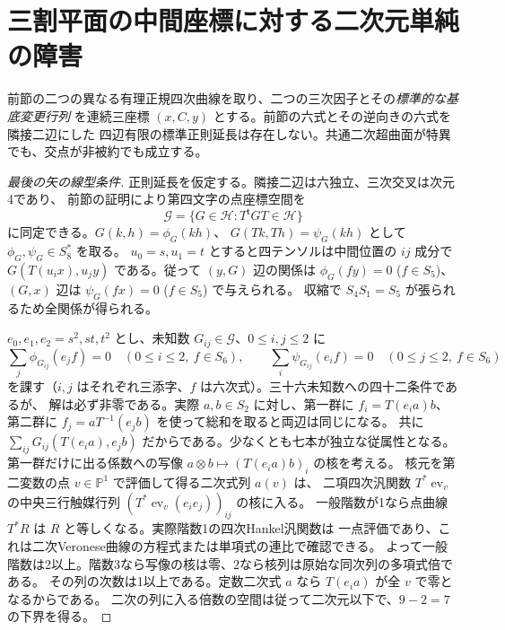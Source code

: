 \section{三割平面の中間座標に対する二次元単純の障害}
\label{sec:trisecant-middle-simple-obstruction}
\begin{theorem}\label{thm:trisecant-middle-simple-obstruction}
前節の二つの異なる有理正規四次曲線を取り、二つの三次因子とその\emph{標準的な基底変更行列}
を連続三座標 $(x,C,y)$ とする。前節の六式とその逆向きの六式を隣接二辺にした
四辺有限の標準正則延長は存在しない。共通二次超曲面が特異でも、交点が非被約でも成立する。
\end{theorem}
\begin{proof}[最後の矢の線型条件]
正則延長を仮定する。隣接二辺は六独立、三次交叉は次元4であり、
前節の証明により第四文字の点座標空間を
\[
 \mathcal G=\{G\in\mathcal H:T^{\mathsf t}GT\in\mathcal H\}
\]
に同定できる。$G(k,h)=\phi_G(kh)$、
$G(Tk,Th)=\psi_G(kh)$ として $\phi_G,\psi_G\in S_8^*$ を取る。
$u_0=s,u_1=t$ とすると四テンソルは中間位置の $ij$ 成分で
$G(T(u_i x),u_j y)$ である。従って $(y,G)$ 辺の関係は
$\phi_G(fy)=0$ ($f\in S_5$)、$(G,x)$ 辺は $\psi_G(fx)=0$ ($f\in S_5$) で与えられる。
収縮で $S_4 S_1=S_5$ が張られるため全関係が得られる。

$e_0,e_1,e_2=s^2,st,t^2$ とし、未知数 $G_{ij}\in\mathcal G$、$0\le i,j\le2$ に
\[
 \sum_j\phi_{G_{ij}}(e_j f)=0\quad(0\le i\le2,\ f\in S_6),\qquad
 \sum_i\psi_{G_{ij}}(e_i f)=0\quad(0\le j\le2,\ f\in S_6)
\]
を課す（$i,j$ はそれぞれ三添字、$f$ は六次式）。三十六未知数への四十二条件であるが、
解は必ず非零である。実際 $a,b\in S_2$ に対し、第一群に $f_i=T(e_i a)b$、
第二群に $f_j=a T^{-1}(e_j b)$ を使って総和を取ると両辺は同じになる。
共に $\sum_{ij}G_{ij}(T(e_i a),e_j b)$ だからである。少なくとも七本が独立な従属性となる。
第一群だけに出る係数への写像
$a\otimes b\mapsto(T(e_i a)b)_i$ の核を考える。
核元を第二変数の点 $v\in\mathbb P^1$ で評価して得る二次式列 $a(v)$ は、
二項四次汎関数 $T^*\operatorname{ev}_v$ の中央三行触媒行列
$(T^*\operatorname{ev}_v(e_i e_j))_{ij}$ の核に入る。
一般階数が1なら点曲線 $T^*R$ は $R$ と等しくなる。実際階数1の四次Hankel汎関数は
一点評価であり、これは二次Veronese曲線の方程式または単項式の連比で確認できる。
よって一般階数は2以上。階数3なら写像の核は零、2なら核列は原始な同次列の多項式倍である。
その列の次数は1以上である。定数二次式 $a$ なら $T(e_i a)$ が全 $v$ で零となるからである。
二次の列に入る倍数の空間は従って二次元以下で、$9-2=7$ の下界を得る。
\end{proof}

